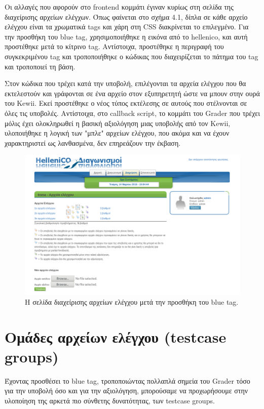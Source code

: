 \documentclass[diploma]{softlab-thesis}
\begin{document}
\bigskip

Οι αλλαγές που αφορούν στο frontend κομμάτι έγιναν κυρίως στη σελίδα της
διαχείρισης αρχείων ελέγχων. Όπως φαίνεται στο σχήμα 4.1, δίπλα σε κάθε
αρχείο ελέγχου είναι τα χρωματικά tags και χάρη στη CSS διακρίνεται το
επιλεγμένο. Για την προσθήκη του blue tag, χρησιμοποιήθηκε η εικόνα από το
hellenico, και αυτή προστέθηκε μετά το κίτρινο tag. Αντίστοιχα, προστέθηκε η
περιγραφή του συγκεκριμένου tag και τροποποιήθηκε ο κώδικας που διαχειρίζεται
το πάτημα του tag και τροποποιεί τη βάση.

\bigskip

Στον κώδικα που τρέχει κατά την υποβολή, επιλέγονται τα αρχεία ελέγχου που θα
εκτελεστούν και γράφονται σε ένα αρχείο στον εξυπηρετητή ώστε να μπουν στην
ουρά του Kewii. Εκεί προστέθηκε ο νέος τύπος εκτέλεσης σε αυτούς που στέλνονται
σε όλες τις υποβολές. Αντίστοιχα, στο callback script, το κομμάτι του Grader
που τρέχει μόλις έχει ολοκληρωθεί η βασική αξιολόγηση μιας υποβολής από τον
Kewii, υλοποιήθηκε η λογική των "μπλε" αρχείων ελέγχου, που ακόμα και να έχουν
χαρακτηριστεί ως λανθασμένα, δεν επηρεάζουν την έκβαση.

\begin{figure}
  \centering
  \includegraphics[scale=0.5,trim=4 4 4 4,clip]{Figures/bluetag.png}
  \caption[Προσθήκη blue tag]{Η σελίδα διαχείρισης αρχείων ελέγχου μετά την
  προσθήκη του blue tag.}
\end{figure}

\section{Ομάδες αρχείων ελέγχου (testcase groups)}

Έχοντας προσθέσει το blue tag, τροποποιώντας πολλαπλά σημεία του Grader τόσο
για την υποβολή όσο και για την αξιολόγηση, μπορούσαμε να προχωρήσουμε στην
υλοποίηση της αρκετά πιο σύνθετης δυνατότητας, των testcase groups.
\end{document}
